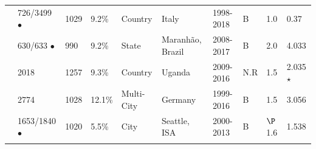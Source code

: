 \documentclass[utf8]{FrontiersinHarvard} %
\begin{document}
\begin{table}[h]
\begin{ssmall}
\begin{tabular}{llllllllll}
			\cite{Fabeni:2020aa}        & 726/3499 $\bullet$  & 1029 & 9.2\%  & Country    & Italy                    & 1998-2018 & B                     & 1.0                                        & 0.37           \\
			\cite{Leal:2020aa}          & 630/633 $\bullet$   & 990  & 9.2\%  & State      & Maranhão, Brazil         & 2008-2017 & B                     & 2.0                                        & 4.033          \\
			\cite{bbosa_short_2020}     & 2018                & 1257 & 9.3\%  & Country    & Uganda                   & 2009-2016 & N.R                   & 1.5                                        & 2.035 $\star$  \\
			\cite{Stecher:2018aa}       & 2774                & 1028 & 12.1\% & Multi-City & Germany                  & 1999-2016 & B                     & 1.5                                        & 3.056          \\
			\cite{chato_public_2020}    & 1653/1840 $\bullet$ & 1020 & 5.5\%  & City       & Seattle, ISA             & 2000-2013 & B                     & $\P$1.6                                    & 1.538          \\
			\\

			\hline
		\end{tabular}
	\end{ssmall}
\end{table}
\end{document}
